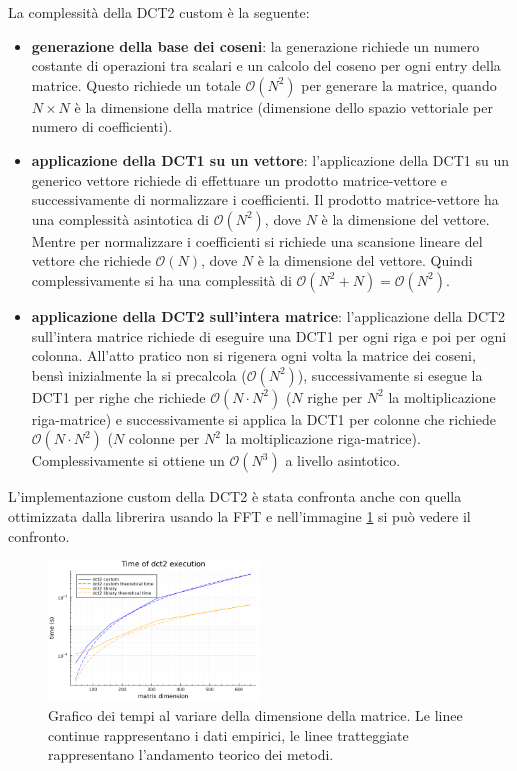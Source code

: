 La complessità della DCT2 custom è la seguente:
\begin{itemize}
    \item \textbf{generazione della base dei coseni}: la generazione richiede
    un numero costante di operazioni tra scalari e un calcolo del coseno per ogni 
    entry della matrice. Questo richiede un totale $\mathcal{O}(N^2)$ per generare 
    la matrice, quando $N\times N$ è la dimensione della matrice (dimensione dello 
    spazio vettoriale per numero di coefficienti).
    \item \textbf{applicazione della DCT1 su un vettore}: l'applicazione della DCT1
    su un generico vettore richiede di effettuare un prodotto matrice-vettore e
    successivamente di normalizzare i coefficienti. Il prodotto matrice-vettore 
    ha una complessità asintotica di $\mathcal{O}(N^2)$, dove $N$ è la dimensione 
    del vettore. Mentre per normalizzare i coefficienti si richiede una scansione 
    lineare del vettore che richiede $\mathcal{O}(N)$, dove $N$ è la dimensione 
    del vettore. Quindi complessivamente si ha una complessità di $\mathcal{O}(N^2 + N) = \mathcal{O}(N^2)$.
    \item \textbf{applicazione della DCT2 sull'intera matrice}: l'applicazione della DCT2
    sull'intera matrice richiede di eseguire una DCT1 per ogni riga e poi per ogni 
    colonna. All'atto pratico non si rigenera ogni volta la matrice dei coseni, 
    bensì inizialmente la si precalcola ($\mathcal{O}(N^2)$), successivamente si 
    esegue la DCT1 per righe che richiede $\mathcal{O}(N \cdot N^2)$ ($N$ righe 
    per $N^2$ la moltiplicazione riga-matrice) e successivamente si applica la 
    DCT1 per colonne che richiede $\mathcal{O}(N \cdot N^2)$ ($N$ colonne 
    per $N^2$ la moltiplicazione riga-matrice). Complessivamente si ottiene 
    un $\mathcal{O}(N^3)$ a livello asintotico.
\end{itemize}

L'implementazione custom della DCT2 è stata confronta anche con quella ottimizzata 
dalla librerira usando la FFT e nell'immagine \ref{fig:analisi_complex} si 
può vedere il confronto.

\begin{figure}[!h]
    \centering
    \includegraphics[width=0.5\textwidth]{Progetto_2/img/times_plot.png}
    \caption{Grafico dei tempi al variare della dimensione della matrice. Le linee
    continue rappresentano i dati empirici, le linee tratteggiate rappresentano 
    l'andamento teorico dei metodi.}
    \label{fig:analisi_complex}
\end{figure}

